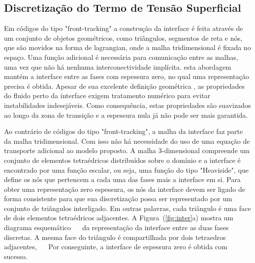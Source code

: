 \documentclass[a4paper,portuges]{article}
\begin{document}
\subsection{Discretização do Termo de Tensão Superficial}

Em códigos do tipo "front-tracking" a construção da interface é feita
através de um conjunto de objetos geométricos, como triângulos,
segmentos de reta e nós, que são movidos na forma de lagrangian, onde a
malha tridimensional é fixada no espaço. Uma função adicional é necessária
para comunicação entre as malhas, uma vez que não há nenhuma
interconectividade implícita. esta abordagem mantém a interface entre as
fases com espessura zero, no qual uma representação precisa é obtida.
Apesar de sua excelente definição geométrica , as propriedades do fluido
perto da interface exigem tratamento numérico para evitar instabilidades
indesejáveis. Como consequência, estas propriedades são suavizados ao
longo da zona de transição e a espessura nula já não pode ser mais
garantida.

Ao contrário de códigos do tipo "front-tracking", a malha da interface
faz parte da malha tridimensional. Com isso não há necessidade do uso de
uma equação de transporte adicional ao modelo proposto. A malha
3-dimensional compreende um conjunto de elementos tetraédricos
distribuídos sobre o domínio e a interface é encontrado por uma função
escalar, ou seja, uma função do tipo "Heaviside", que define os nós que
pertencem a cada uma das fases mais a interface em si. Para obter uma
representação zero espessura, os nós da interface devem ser ligado de
forma consistente para que sua discretização possa ser representado por
um conjunto de triângulos interligado. Em outras palavras, cada
triângulo é uma face de dois elementos tetraédricos adjacentes. A
Figura~(\ref{fig:inter}a) mostra um diagrama esquemático    da
representação da interface entre as duas fases discretas. A mesma face
do triângulo é compartilhada por dois tetraedros adjacentes,    Por
conseguinte, a interface de espessura zero é obtida com sucesso.
\end{document}
